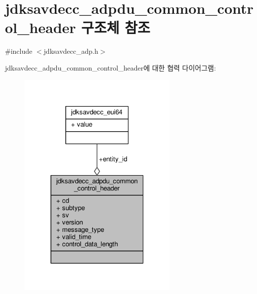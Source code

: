 \hypertarget{structjdksavdecc__adpdu__common__control__header}{}\section{jdksavdecc\+\_\+adpdu\+\_\+common\+\_\+control\+\_\+header 구조체 참조}
\label{structjdksavdecc__adpdu__common__control__header}


{\ttfamily \#include $<$jdksavdecc\+\_\+adp.\+h$>$}



jdksavdecc\+\_\+adpdu\+\_\+common\+\_\+control\+\_\+header에 대한 협력 다이어그램\+:
\nopagebreak
\begin{figure}[H]
\begin{center}
\leavevmode
\includegraphics[width=220pt]{structjdksavdecc__adpdu__common__control__header__coll__graph}
\end{center}
\end{figure}
